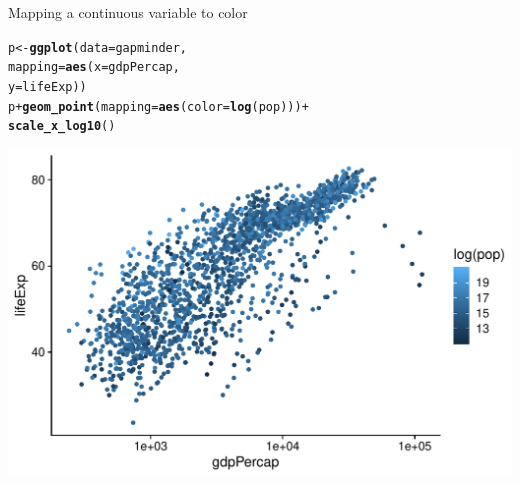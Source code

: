 \documentclass[10pt]{beamer}\usepackage[]{graphicx}\usepackage[]{color}
\makeatletter
\def\maxwidth{ %
  \ifdim\Gin@nat@width>\linewidth
    \linewidth
  \else
    \Gin@nat@width
  \fi
}
\newcommand{\hlopt}[1]{\textcolor[rgb]{0,0,0}{#1}}%
\newcommand{\hlstd}[1]{\textcolor[rgb]{0.345,0.345,0.345}{#1}}%
\newcommand{\hlkwb}[1]{\textcolor[rgb]{0.69,0.353,0.396}{#1}}%
\newcommand{\hlkwc}[1]{\textcolor[rgb]{0.333,0.667,0.333}{#1}}%
\newcommand{\hlkwd}[1]{\textcolor[rgb]{0.737,0.353,0.396}{\textbf{#1}}}%
\newenvironment{kframe}{%
 \def\at@end@of@kframe{}%
 \ifinner\ifhmode%
  \def\at@end@of@kframe{\end{minipage}}%
  \begin{minipage}{\columnwidth}%
 \fi\fi%
 \def\FrameCommand##1{\hskip\@totalleftmargin \hskip-\fboxsep
 \colorbox{shadecolor}{##1}\hskip-\fboxsep
     \hskip-\linewidth \hskip-\@totalleftmargin \hskip\columnwidth}%
 \MakeFramed {\advance\hsize-\width
   \@totalleftmargin\z@ \linewidth\hsize
   \@setminipage}}%
 {\par\unskip\endMakeFramed%
 \at@end@of@kframe}
\newenvironment{knitrout}{}{} %
\makeatother
\begin{document}
\begin{frame}[fragile]{Mapping a continuous variable to color}
\begin{knitrout}\tiny
{}\color{fgcolor}\begin{kframe}
\begin{alltt}
\hlstd{p} \hlkwb{<-} \hlkwd{ggplot}\hlstd{(}\hlkwc{data} \hlstd{= gapminder,}
            \hlkwc{mapping} \hlstd{=} \hlkwd{aes}\hlstd{(}\hlkwc{x} \hlstd{= gdpPercap,}
                          \hlkwc{y} \hlstd{= lifeExp))}
\hlstd{p} \hlopt{+} \hlkwd{geom_point}\hlstd{(}\hlkwc{mapping} \hlstd{=} \hlkwd{aes}\hlstd{(}\hlkwc{color} \hlstd{=} \hlkwd{log}\hlstd{(pop)))} \hlopt{+}
                 \hlkwd{scale_x_log10}\hlstd{()}
\end{alltt}
\end{kframe}

{\centering \includegraphics[width=\maxwidth]{figure/unnamed-chunk-19-1} 

}


\end{knitrout}

	
\end{frame}
\end{document}
